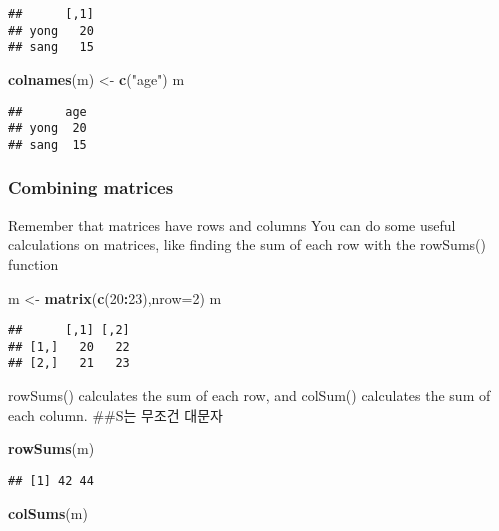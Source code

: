 \documentclass[
]{article}
\newenvironment{Shaded}{\begin{snugshade}}{\end{snugshade}}
\newcommand{\DataTypeTok}[1]{\textcolor[rgb]{0.13,0.29,0.53}{#1}}
\newcommand{\DecValTok}[1]{\textcolor[rgb]{0.00,0.00,0.81}{#1}}
\newcommand{\KeywordTok}[1]{\textcolor[rgb]{0.13,0.29,0.53}{\textbf{#1}}}
\newcommand{\NormalTok}[1]{#1}
\newcommand{\OperatorTok}[1]{\textcolor[rgb]{0.81,0.36,0.00}{\textbf{#1}}}
\newcommand{\StringTok}[1]{\textcolor[rgb]{0.31,0.60,0.02}{#1}}
\begin{document}
\begin{verbatim}
##      [,1]
## yong   20
## sang   15
\end{verbatim}

\begin{Shaded}
\begin{Highlighting}[]
\KeywordTok{colnames}\NormalTok{(m) <-}\StringTok{ }\KeywordTok{c}\NormalTok{(}\StringTok{"age"}\NormalTok{)}
\NormalTok{m}
\end{Highlighting}
\end{Shaded}

\begin{verbatim}
##      age
## yong  20
## sang  15
\end{verbatim}

\hypertarget{combining-matrices}{%
\subsubsection{Combining matrices}\label{combining-matrices}}

Remember that matrices have rows and columns You can do some useful
calculations on matrices, like finding the sum of each row with the
rowSums() function

\begin{Shaded}
\begin{Highlighting}[]
\NormalTok{m <-}\StringTok{ }\KeywordTok{matrix}\NormalTok{(}\KeywordTok{c}\NormalTok{(}\DecValTok{20}\OperatorTok{:}\DecValTok{23}\NormalTok{),}\DataTypeTok{nrow=}\DecValTok{2}\NormalTok{)}
\NormalTok{m}
\end{Highlighting}
\end{Shaded}

\begin{verbatim}
##      [,1] [,2]
## [1,]   20   22
## [2,]   21   23
\end{verbatim}

rowSums() calculates the sum of each row, and colSum() calculates the
sum of each column. \#\#S는 무조건 대문자

\begin{Shaded}
\begin{Highlighting}[]
\KeywordTok{rowSums}\NormalTok{(m)}
\end{Highlighting}
\end{Shaded}

\begin{verbatim}
## [1] 42 44
\end{verbatim}

\begin{Shaded}
\begin{Highlighting}[]
\KeywordTok{colSums}\NormalTok{(m)}
\end{Highlighting}
\end{Shaded}
\end{document}
